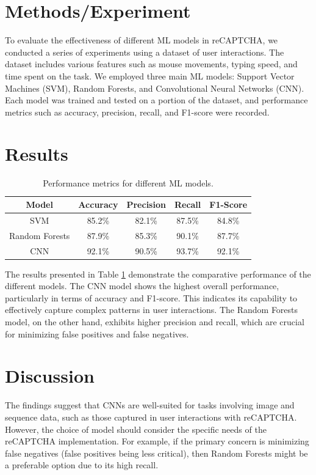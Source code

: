 \section{Methods/Experiment}
To evaluate the effectiveness of different ML models in reCAPTCHA, we conducted a series of experiments using a dataset of user interactions. The dataset includes various features such as mouse movements, typing speed, and time spent on the task. We employed three main ML models: Support Vector Machines (SVM), Random Forests, and Convolutional Neural Networks (CNN). Each model was trained and tested on a portion of the dataset, and performance metrics such as accuracy, precision, recall, and F1-score were recorded.

\section{Results}
\begin{table}[h]
\centering
\begin{tabular}{|c|c|c|c|c|}
\hline
Model & Accuracy & Precision & Recall & F1-Score \\
\hline
SVM & 85.2\% & 82.1\% & 87.5\% & 84.8\% \\
Random Forests & 87.9\% & 85.3\% & 90.1\% & 87.7\% \\
CNN & 92.1\% & 90.5\% & 93.7\% & 92.1\% \\
\hline
\end{tabular}
\caption{Performance metrics for different ML models.}
\label{tab:ml_models}
\end{table}

The results presented in Table \ref{tab:ml_models} demonstrate the comparative performance of the different models. The CNN model shows the highest overall performance, particularly in terms of accuracy and F1-score. This indicates its capability to effectively capture complex patterns in user interactions. The Random Forests model, on the other hand, exhibits higher precision and recall, which are crucial for minimizing false positives and false negatives.

\section{Discussion}
The findings suggest that CNNs are well-suited for tasks involving image and sequence data, such as those captured in user interactions with reCAPTCHA. However, the choice of model should consider the specific needs of the reCAPTCHA implementation. For example, if the primary concern is minimizing false negatives (false positives being less critical), then Random Forests might be a preferable option due to its high recall.

